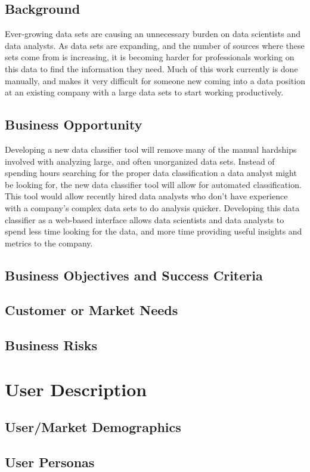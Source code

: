\documentclass[12pt,oneside,letterpaper]{article}
\begin{document}
\subsection{Background}
Ever-growing data sets are causing an unnecessary burden on data scientists and data analysts. As data sets are expanding, and the number of sources where these sets come from is increasing, it is becoming harder for professionals working on this data to find the information they need. Much of this work currently is done manually, and makes it very difficult for someone new coming into a data position at an existing company with a large data sets to start working productively.
\subsection{Business Opportunity}
Developing a new data classifier tool will remove many of the manual hardships involved with analyzing large, and often unorganized data sets. Instead of spending hours searching for the proper data classification a data analyst might be looking for, the new data classifier tool will allow for automated classification. This tool would allow recently hired data analysts who don't have experience with a company's complex data sets to do analysis quicker. Developing this data classifier as a web-based interface allows data scientists and data analysts to spend less time looking for the data, and more time providing useful insights and metrics to the company.
\subsection{Business Objectives and Success Criteria}
\subsection{Customer or Market Needs}
\subsection{Business Risks}

\section{User Description}
\subsection{User/Market Demographics}
\subsection{User Personas}
\end{document}

